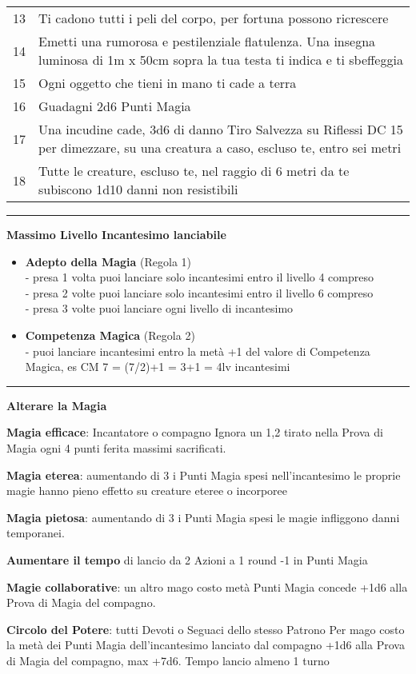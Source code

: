 \documentclass[a4paper,12 pt,openany]{book}
\newcommand{\riga}{\rule{\textwidth}{0.4pt}}
\begin{document}
\begin{textblock*}{13.5cm}
\begin{tabularx}{0.95\textwidth}{lX}
13 & Ti cadono tutti i peli del corpo, per fortuna possono ricrescere\\
14 & Emetti una rumorosa e pestilenziale flatulenza. Una insegna luminosa di 1m x 50cm sopra la tua testa ti indica e ti sbeffeggia\\
15 & Ogni oggetto che tieni in mano ti cade a terra\\
16 & Guadagni 2d6 Punti Magia\\
17 & Una incudine cade, 3d6 di danno Tiro Salvezza su Riflessi DC 15 per dimezzare, su una creatura a caso, escluso te, entro sei metri\\
18 & Tutte le creature, escluso te, nel raggio di 6 metri da te subiscono 1d10 danni non resistibili
\end{tabularx}

\riga

\textbf{Massimo Livello Incantesimo lanciabile}

\begin{itemize}
	\item
	\textbf{Adepto della Magia} (Regola 1) \\
	- presa 1 volta puoi lanciare solo incantesimi entro il livello 4 compreso\\
	- presa 2 volte puoi lanciare solo incantesimi entro il livello 6 compreso\\
	- presa 3 volte puoi lanciare ogni livello di incantesimo

	\item
	\textbf{Competenza Magica} (Regola 2)\\
	- puoi lanciare incantesimi entro la metà +1 del valore di Competenza Magica, es CM 7 = (7/2)+1 = 3+1 = 4lv incantesimi

\end{itemize}

\riga

\textbf{Alterare la Magia}

\textbf{Magia efficace}: Incantatore o compagno Ignora un 1,2 tirato nella Prova di Magia ogni 4 punti ferita massimi sacrificati.

\textbf{Magia eterea}: aumentando di 3 i Punti Magia spesi nell'incantesimo le proprie magie hanno pieno effetto su creature eteree o incorporee

\textbf{Magia pietosa}: aumentando di 3 i Punti Magia spesi le magie infliggono danni temporanei.

\textbf{Aumentare il tempo} di lancio da 2 Azioni a 1 round -1 in Punti Magia

\textbf{Magie collaborative}: un altro mago costo metà Punti Magia concede +1d6 alla Prova di Magia del compagno.

\textbf{Circolo del Potere}: tutti Devoti o Seguaci dello stesso Patrono
Per mago costo la metà dei Punti Magia dell'incantesimo lanciato dal compagno +1d6 alla Prova di Magia del compagno, max +7d6. Tempo lancio almeno 1 turno
\end{textblock*}

~\newpage
\end{document}
